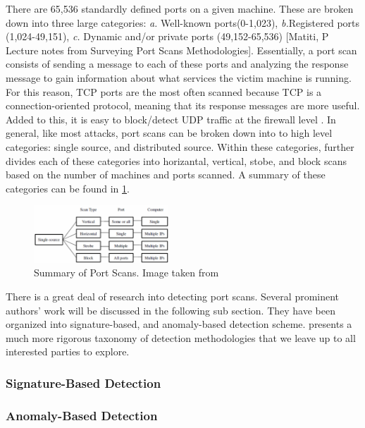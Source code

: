 \documentclass{acm_proc_article-sp}
\begin{document}
	 There are 65,536 standardly defined ports on a given machine. These are broken down into three large categories: \emph{a.} Well-known ports(0-1,023), \emph{b.}Registered ports (1,024-49,151), \emph{c.} Dynamic and/or private ports (49,152-65,536) [Matiti, P Lecture notes from Surveying Port Scans Methodologies]. %
Essentially, a port scan consists of sending a message to each of these ports and analyzing the response message to gain information about what services the victim machine is running. For this reason, TCP ports are the most often scanned because TCP is a connection-oriented protocol, meaning that its response messages are more useful. Added to this, it is easy to block/detect UDP traffic at the firewall level \cite{Bhuyan2011}. In general, like most attacks, port scans can be broken down into to high level categories: single source, and distributed source. Within these categories, \cite{Staniford2002} further divides each of these categories into horizantal, vertical, stobe, and block scans based on the number of machines and ports scanned. A summary of these categories can be found in \ref{portScans}.
	\begin{figure}[h!]
		\centering
		\includegraphics[width=0.45\textwidth]{portScans.png}
		\caption{Summary of Port Scans. Image taken from \cite{Bhuyan2011}}
		\label{portScans}
	\end{figure}
	
	There is a great deal of research into detecting port scans. Several prominent authors' work will be discussed in the following sub section. They have been organized into signature-based, and anomaly-based detection scheme. \cite{Bhuyan2011} presents a much more rigorous taxonomy of detection methodologies that we leave up to all interested parties to explore. 
		\subsubsection{Signature-Based Detection}
		\begin{description}
			\item[] %
			\item[] %
		\end{description}
		\subsubsection{Anomaly-Based Detection}
		
\end{document}
